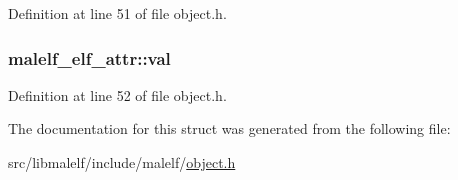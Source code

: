Definition at line 51 of file object.h.

\hypertarget{structmalelf__elf__attr_af49e74a88d3f8f78a0ab58ba788afcbc}{
\subsubsection[{val}]{ {\bf malelf\_\-elf\_\-attr::val}}}
\label{structmalelf__elf__attr_af49e74a88d3f8f78a0ab58ba788afcbc}


Definition at line 52 of file object.h.



The documentation for this struct was generated from the following file:\begin{DoxyCompactItemize}
\item 
src/libmalelf/include/malelf/\hyperlink{object_8h}{object.h}\end{DoxyCompactItemize}
